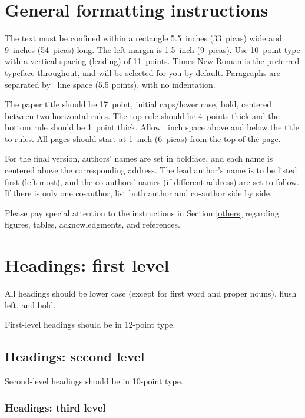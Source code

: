 \documentclass{article}
\begin{document}
\section{General formatting instructions}
\label{gen_inst}

The text must be confined within a rectangle 5.5~inches (33~picas) wide and
9~inches (54~picas) long. The left margin is 1.5~inch (9~picas).  Use 10~point
type with a vertical spacing (leading) of 11~points.  Times New Roman is the
preferred typeface throughout, and will be selected for you by default.
Paragraphs are separated by ~line space (5.5 points), with no
indentation.

The paper title should be 17~point, initial caps/lower case, bold, centered
between two horizontal rules. The top rule should be 4~points thick and the
bottom rule should be 1~point thick. Allow ~inch space above and
below the title to rules. All pages should start at 1~inch (6~picas) from the
top of the page.

For the final version, authors' names are set in boldface, and each name is
centered above the corresponding address. The lead author's name is to be listed
first (left-most), and the co-authors' names (if different address) are set to
follow. If there is only one co-author, list both author and co-author side by
side.

Please pay special attention to the instructions in Section \ref{others}
regarding figures, tables, acknowledgments, and references.

\section{Headings: first level}
\label{headings}

All headings should be lower case (except for first word and proper nouns),
flush left, and bold.

First-level headings should be in 12-point type.

\subsection{Headings: second level}

Second-level headings should be in 10-point type.

\subsubsection{Headings: third level}
\end{document}
